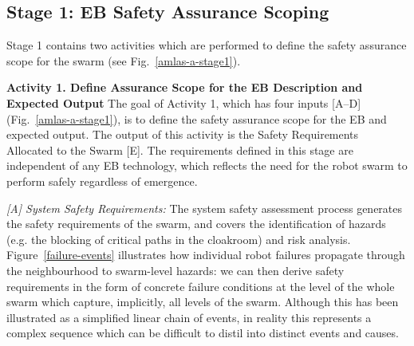 \documentclass[runningheads]{llncs}
\begin{document}
\subsection{Stage 1: EB Safety Assurance Scoping} \label{framework-stage1}
Stage 1 contains two activities which are performed to define the safety assurance scope for the swarm (see Fig.~\ref{amlas-a-stage1}). 

\noindent\textbf{Activity 1. Define Assurance Scope for the EB Description and Expected Output}
The goal of Activity 1, which has four inputs [A--D] (Fig.~\ref{amlas-a-stage1}), is to define the safety assurance scope for the EB and expected output. 
The output of this activity is the Safety Requirements Allocated to the Swarm [E]. The requirements defined in this stage are independent of any EB technology, which reflects the need for the robot swarm to perform safely regardless of emergence. %

\emph{[A] System Safety Requirements:}
The system safety assessment process generates the safety requirements of the swarm, and covers the identification of hazards (e.g. the blocking of critical paths in the cloakroom) and risk analysis.
Figure~\ref{failure-events} illustrates how individual robot failures propagate through the neighbourhood to swarm-level hazards: we can then derive safety requirements in the form of concrete failure conditions at the level of the whole swarm which capture, implicitly, all levels of the swarm. 
Although this has been illustrated as a simplified linear chain of events, in reality this represents a complex sequence which can be difficult to distil into distinct events and causes. 
\end{document}
